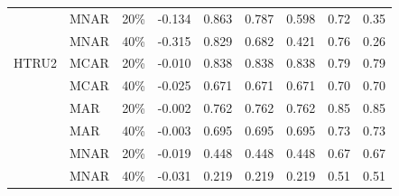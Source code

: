 \begin{tabular}{lllrrrrrr}
 & MNAR & 20\% & -0.134 & 0.863 & 0.787 & 0.598 & 0.72 & 0.35 \\
 & MNAR & 40\% & -0.315 & 0.829 & 0.682 & 0.421 & 0.76 & 0.26 \\
\midrule
HTRU2 & MCAR & 20\% & -0.010 & 0.838 & 0.838 & 0.838 & 0.79 & 0.79 \\
 & MCAR & 40\% & -0.025 & 0.671 & 0.671 & 0.671 & 0.70 & 0.70 \\
 & MAR & 20\% & -0.002 & 0.762 & 0.762 & 0.762 & 0.85 & 0.85 \\
 & MAR & 40\% & -0.003 & 0.695 & 0.695 & 0.695 & 0.73 & 0.73 \\
 & MNAR & 20\% & -0.019 & 0.448 & 0.448 & 0.448 & 0.67 & 0.67 \\
 & MNAR & 40\% & -0.031 & 0.219 & 0.219 & 0.219 & 0.51 & 0.51 \\
\bottomrule
\end{tabular}